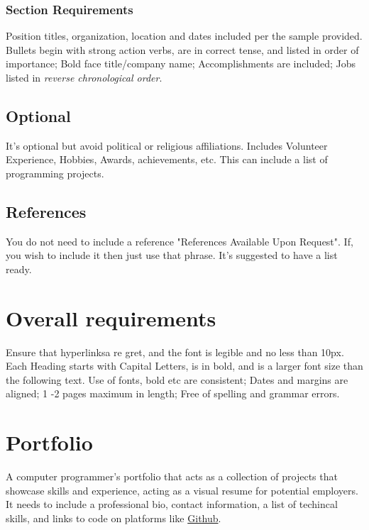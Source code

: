 \documentclass{report}
\begin{document}
	\subsubsection*{Section Requirements}
	Position titles, organization, location and dates included per the sample provided. Bullets begin with strong action verbs, are in correct tense, and listed in order of importance; Bold face title/company name; Accomplishments are included; Jobs listed in \emph{reverse chronological order}.

	\subsection{Optional}
    	\label{sec:optionalResume} %
	It's optional but avoid political or religious affiliations. Includes Volunteer Experience, Hobbies, Awards, achievements, etc.
	This can include a list of programming projects.

	\subsection{References}
    	\label{sec:optionalRef} %
	You do not need to include a reference "References Available Upon Request". If, you wish to include it then just use that phrase. It's suggested to have a list ready.

	\section{Overall requirements}
	Ensure that hyperlinksa re gret, and the font is legible and no less than 10px.
	Each Heading starts with Capital Letters, is in bold, and is a larger font size than the following text. Use of fonts, bold etc are consistent; Dates and margins are aligned; 1 -2 pages maximum in length; Free of spelling and grammar errors.

	\newpage
	\section{Portfolio}
	\label{sec:portfolio} %
	A computer programmer's portfolio that acts as a collection of projects that showcase skills and experience, acting as a visual resume for potential employers. It needs to include a professional bio, contact information, a list of techincal skills, and links to code on platforms like \href{https://github.com}{Github}. 
\end{document}
